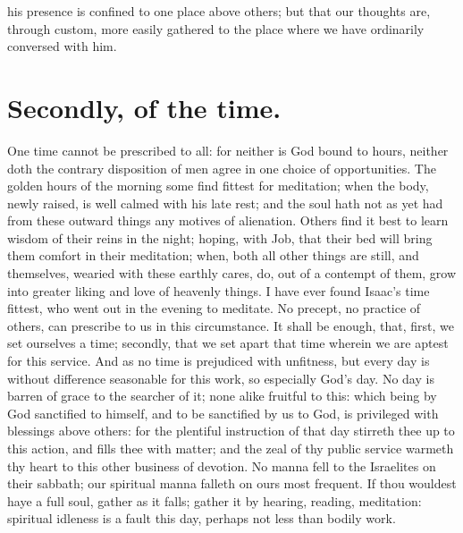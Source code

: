 his presence is confined to one place above others; but that our thoughts are, through custom, more easily gathered to the place where we have ordinarily conversed with him. 

\section{Secondly, of the time.}
One time cannot be prescribed to all: for neither is God bound to hours, neither doth the contrary disposition of men agree in one choice of opportunities. The golden hours of the morning some find fittest for meditation; when the body, newly raised, is well calmed with his late rest; and the soul hath not as yet had from these outward things any motives of alienation. Others find it best to learn wisdom of their reins in the night; hoping, with Job, that their bed will bring them comfort in their meditation; when, both all other things are still, and themselves, wearied with these earthly cares, do, out of a contempt of them, grow into greater liking and love of heavenly things. I have ever found Isaac's time fittest, who went out in the evening to meditate. No precept, no practice of others, can prescribe to us in this circumstance. It shall be enough, that, first, we set ourselves a time; secondly, that we set apart that time wherein we are aptest for this service. And as no time is prejudiced with unfitness, but every day is without difference seasonable for this work, so especially God's day. No day is barren of grace to the searcher of it; none alike fruitful to this: which being by God sanctified to himself, and to be sanctified by us to God, is privileged with blessings above others: for the plentiful instruction of that day stirreth thee up to this action, and fills thee with matter; and the zeal of thy public service warmeth thy heart to this other business of devotion. No manna fell to the Israelites on their sabbath; our spiritual manna falleth on ours most frequent. If thou wouldest haye a full soul, gather as it falls; gather it by hearing, reading, meditation: spiritual idleness is a fault this day, perhaps not less than bodily work. 

